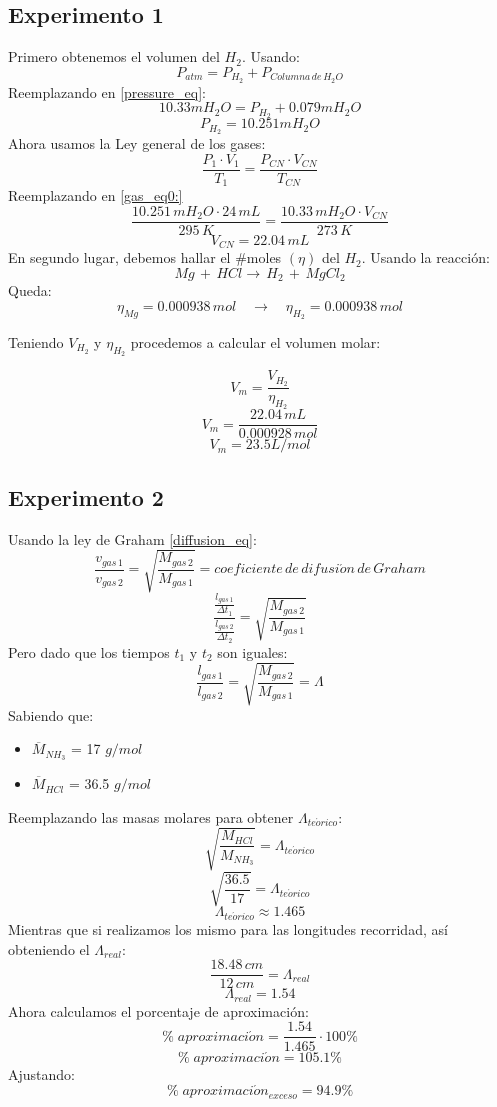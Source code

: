 \documentclass[../main.tex]{subfiles}
\begin{document}
\subsection{Experimento 1}
Primero obtenemos el volumen del $H_2$.
Usando:
\begin{equation} \label{pressure_eq}
    P_{atm} = P_{H_2} + P_{Columna \, de \, H_2O}
\end{equation}
Reemplazando en \ref{pressure_eq}:
\[ 10.33mH_2O = P_{H_2} + 0.079mH_2O \]
\[ P_{H_2} = 10.251mH_2O \]
Ahora usamos la Ley general de los gases:
\begin{equation} \label{gas_eq}
    \frac{P_1 \cdot V_1}{T_1} = \frac{P_{CN} \cdot V_{CN}}{T_{CN}}
\end{equation}
Reemplazando en \ref{gas_eq0:}
\[
    \frac{10.251 \, mH_2O \cdot 24 \, mL}{295 \, K} =
    \frac{10.33 \, mH_2O \cdot V_{CN}}{273 \, K}
\]
\[ V_{CN} = 22.04 \, mL\]
En segundo lugar, debemos hallar el $\#$moles $(\eta)$ del $H_2$.
Usando la reacción:
\[ Mg \, + \, HCl \rightarrow \, H_2 \, + \, MgCl_2 \]
Queda:
\[\eta_{Mg} = 0.000938 \, mol \quad \rightarrow \quad \eta_{H_2} = 0.000938 \,mol\]

Teniendo $V_{H_2}$ y $\eta_{H_2}$ procedemos a calcular el volumen molar:

\[V_m = \frac{V_{H_2}}{\eta_{H_2}}\]
\[V_m = \frac{22.04 \, mL}{0.000928 \, mol}\]
\[V_m = 23.5 L/mol\]

\subsection{Experimento 2}

Usando la ley de Graham \ref{diffusion_eq}:
\begin{equation}
    \frac{v_{gas\, 1}}{v_{gas\, 2}} =
    \sqrt{\frac{M_{gas\, 2}}{M_{gas\, 1}}} =
    coeficiente \, de \, difusi\acute{o}n \, de \, Graham
\end{equation}
\[
    \frac{\frac{l_{gas\, 1}}{\Delta t_1}}{\frac{l_{gas\, 2}}{\Delta t_2}} =
    \sqrt{\frac{M_{gas\, 2}}{M_{gas\, 1}}} 
\]
Pero dado que los tiempos $t_1$ y $t_2$ son iguales:
\[
    \frac{l_{gas\, 1}}{l_{gas\, 2}} =
    \sqrt{\frac{M_{gas\, 2}}{M_{gas\, 1}}} =
    \Lambda
\]
Sabiendo que:
\begin{itemize}
    \item $\overline{M}_{NH_3}$ = 17 $g/mol$
    \item $\overline{M}_{HCl}$  = 36.5 $g/mol$
\end{itemize}
Reemplazando las masas molares para obtener $\Lambda_{te\acute{o}rico}$:
\[
    \sqrt{\frac{M_{HCl}}{M_{NH_3}}} =
    \Lambda_{te\acute{o}rico}
\]
\[
    \sqrt{\frac{36.5}{17}} =
    \Lambda_{te\acute{o}rico}
\]
\[ \Lambda_{te\acute{o}rico} \approx 1.465 \]
Mientras que si realizamos los mismo para las longitudes recorridad, así 
obteniendo el $\Lambda_{real}$:
\[
    \frac{18.48 \, cm}{12 \, cm} =
    \Lambda_{real}
\]
\[ \Lambda_{real} = 1.54\]
Ahora calculamos el porcentaje de aproximación:
\[ \% \; aproximaci\acute{o}n = \frac{1.54}{1.465} \cdot 100\%\]    
\[ \% \; aproximaci\acute{o}n = 105.1\%\]
Ajustando:
\[ \% \; aproximaci\acute{o}n_{exceso} = 94.9\%\]
\end{document}
